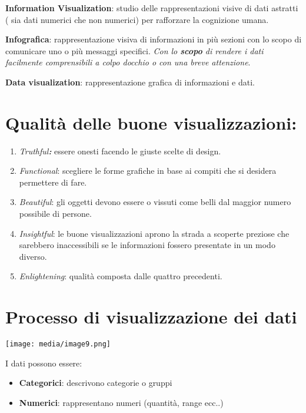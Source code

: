 \textbf{Information Visualization}: studio delle rappresentazioni visive
di dati astratti ( sia dati numerici che non numerici) per rafforzare la
cognizione umana.

\textbf{Infografica}: rappresentazione visiva di informazioni in più
sezioni con lo scopo di comunicare uno o più messaggi specifici.
\emph{Con lo \textbf{scopo} di rendere i dati facilmente comprensibili a
colpo d\textquotesingle occhio o con una breve attenzione}.

\textbf{Data visualization}: rappresentazione grafica di informazioni e
dati.

\section{\texorpdfstring{\textbf{Qualità delle buone
visualizzazioni}:}{Qualità delle buone visualizzazioni:}}\label{qualituxe0-delle-buone-visualizzazioni}

\begin{enumerate}
\def\labelenumi{\arabic{enumi}.}
\item
  \emph{Truthful\textbf{: }}essere onesti facendo le giuste scelte di
  design.
\item
  \emph{Functional}: scegliere le forme grafiche in base ai compiti che
  si desidera permettere di fare.
\item
  \emph{Beautiful}: gli oggetti devono essere o vissuti come belli dal
  maggior numero possibile di persone.
\item
  \emph{Insightful}: le buone visualizzazioni aprono la strada a
  scoperte preziose che sarebbero inaccessibili se le informazioni
  fossero presentate in un modo diverso.
\item
  \emph{Enlightening}: qualità composta dalle quattro precedenti.
\end{enumerate}

\section{Processo di visualizzazione dei
dati}\label{processo-di-visualizzazione-dei-dati}

\texttt{[image: media/image9.png]}

I dati possono essere:

\begin{itemize}
\item
  \textbf{Categorici}: descrivono categorie o gruppi
\item
  \textbf{Numerici}: rappresentano numeri (quantità, range ecc..)
\end{itemize}

